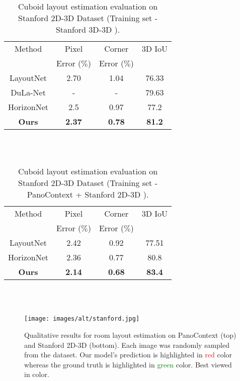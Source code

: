 \documentclass[final]{cvpr}
\begin{document}
\begin{table}[t]
\centering
 \begin{tabular}{||c c c c||} 
 \hline
 Method & Pixel & Corner & 3D IoU \\ [0.5ex] 
  &Error ($\%$)&Error ($\%$)&\\[0.5ex]

 \hline\hline
 LayoutNet \cite{zou2018layoutnet} & 2.70 & 1.04 & 76.33 \\
  \hline
 DuLa-Net \cite{yang2019dula} & - & - & 79.63 \\
 \hline
 HorizonNet \cite{sun2019horizonnet} & 2.5 & 0.97 &  77.2\\ 
 \hline
 \textbf{Ours} & \textbf{2.37} & \textbf{0.78} & \textbf{81.2} \\ 
 \hline
 
 
\end{tabular} \\~\\
\caption{Cuboid layout estimation evaluation on Stanford 2D-3D Dataset \cite{armeni2017joint} (Training set - Stanford 3D-3D \cite{armeni2017joint}).}
\label{tab:Table3}
\end{table}


\begin{table}[t]
\centering
 \begin{tabular}{||c c c c||} 
 \hline
 Method & Pixel & Corner & 3D IoU \\ [0.5ex] 
  &Error ($\%$)&Error ($\%$)&\\[0.5ex]
 \hline\hline
 LayoutNet \cite{zou2018layoutnet} & 2.42 & 0.92 & 77.51 \\
 \hline
 HorizonNet \cite{sun2019horizonnet} & 2.36 & 0.77 & 80.8 \\ 
 \hline
 \textbf{Ours} & \textbf{2.14} & \textbf{0.68} &  \textbf{83.4}\\ 
 \hline
\end{tabular} \\~\\
\caption{Cuboid layout estimation evaluation on Stanford 2D-3D Dataset \cite{armeni2017joint} (Training set - PanoContext \cite{zhang2014panocontext} + Stanford 2D-3D \cite{armeni2017joint}).}
\label{tab:Table4}
\end{table}




\begin{figure*}[!t]
    \centering
    \texttt{[image: images/alt/stanford.jpg]}
    \caption{Qualitative results for room layout estimation on PanoContext \cite{zhang2014panocontext} (top) and Stanford 2D-3D \cite{armeni2017joint} (bottom). Each image was randomly sampled from the dataset. Our model's prediction is highlighted in \textcolor{red}{red} color whereas the ground truth is highlighted in \textcolor{green}{green} color. Best viewed in color.}
    \label{fig:stanford_Results}
\end{figure*}
\end{document}
